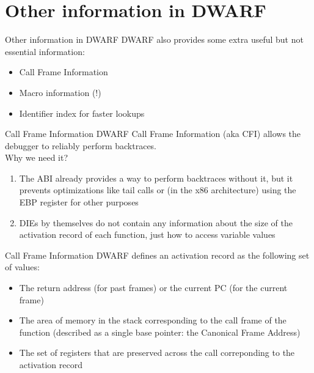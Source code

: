 
\section{Other information in DWARF}


\begin{frame}{Other information in DWARF}
DWARF also provides some extra useful but not essential information:
\begin{itemize}
\item Call Frame Information
\item Macro information (!)
\item Identifier index for faster lookups
\end{itemize}
\end{frame}


\begin{frame}{Call Frame Information}
DWARF Call Frame Information (aka CFI) allows the debugger to reliably perform
backtraces.\\
\medskip
Why we need it?\\
\medskip
\begin{enumerate}
\item The ABI already provides a way to perform backtraces without it, but it
	prevents optimizations like tail calls or (in the x86 architecture) using the
	EBP register for other purposes
\item DIEs by themselves do not contain any information about the size
	of the activation record of each function, just how to access variable values
\end{enumerate}
\end{frame}


\begin{frame}{Call Frame Information}
DWARF defines an activation record as the following set of values:\\
\medskip
\begin{itemize}
\item The return address (for past frames) or the current PC (for the current frame)
\item The area of memory in the stack corresponding to the call frame of the function
	(described as a single base pointer: the Canonical Frame Address)
\item The set of registers that are preserved across the call correponding to the
	activation record
\end{itemize}
\end{frame}


